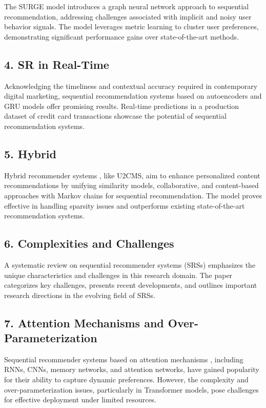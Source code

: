 \documentclass[journal]{IEEEtran}
\begin{document}
The SURGE model \cite{10.1145/3404835.3462968} introduces a graph neural network approach to sequential recommendation, addressing challenges associated with 
implicit and noisy user behavior signals. The model leverages metric learning to cluster user preferences, demonstrating significant 
performance gains over state-of-the-art methods.

\subsection*{4. SR in Real-Time}

Acknowledging the timeliness and contextual accuracy required in contemporary digital marketing, sequential recommendation systems 
based on autoencoders and GRU models offer promising results. Real-time predictions \cite{SRMNPP} in a production dataset of credit card transactions 
showcase the potential of sequential recommendation systems.

\subsection*{5. Hybrid}

Hybrid recommender systems \cite{SRMNPP,9207880}, like U2CMS, aim to enhance personalized content recommendations by unifying similarity models, 
collaborative, and content-based approaches with Markov chains for sequential recommendation. The model proves effective in handling 
sparsity issues and outperforms existing state-of-the-art recommendation systems.

\subsection*{6. Complexities and Challenges}

A systematic review on sequential recommender systems (SRSs) emphasizes the unique characteristics and challenges \cite{Wang_2019} in this research 
domain. The paper categorizes key challenges, presents recent developments, and outlines important research directions in the 
evolving field of SRSs.

\subsection*{7. Attention Mechanisms and Over-Parameterization}

Sequential recommender systems based on attention mechanisms \cite{9123874}, including RNNs, CNNs, memory networks, and attention networks, have 
gained popularity for their ability to capture dynamic preferences. However, the complexity and over-parameterization issues, 
particularly in Transformer models, pose challenges for effective deployment under limited resources.
\end{document}

